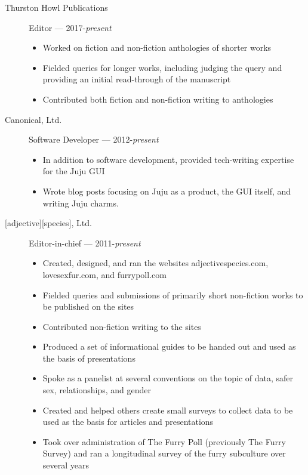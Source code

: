 \begin{description}
\item[Thurston Howl Publications]
Editor --- 2017-\emph{present}

\begin{itemize}
\tightlist
\item
  Worked on fiction and non-fiction anthologies of shorter works
\item
  Fielded queries for longer works, including judging the query and
  providing an initial read-through of the manuscript
\item
  Contributed both fiction and non-fiction writing to anthologies
\end{itemize}
\item[Canonical, Ltd.]
Software Developer --- 2012-\emph{present}

\begin{itemize}
\tightlist
\item
  In addition to software development, provided tech-writing expertise
  for the Juju GUI
\item
  Wrote blog posts focusing on Juju as a product, the GUI itself, and
  writing Juju charms.
\end{itemize}
\item[{[}adjective{]}{[}species{]}, Ltd.]
Editor-in-chief --- 2011-\emph{present}

\begin{itemize}
\tightlist
\item
  Created, designed, and ran the websites adjectivespecies.com,
  lovesexfur.com, and furrypoll.com
\item
  Fielded queries and submissions of primarily short non-fiction works
  to be published on the sites
\item
  Contributed non-fiction writing to the sites
\item
  Produced a set of informational guides to be handed out and used as
  the basis of presentations
\item
  Spoke as a panelist at several conventions on the topic of data, safer
  sex, relationships, and gender
\item
  Created and helped others create small surveys to collect data to be
  used as the basis for articles and presentations
\item
  Took over administration of The Furry Poll (previously The Furry
  Survey) and ran a longitudinal survey of the furry subculture over
  several years
\end{itemize}
\end{description}
